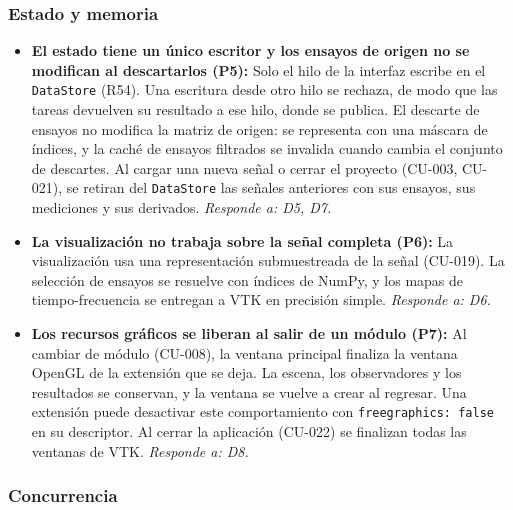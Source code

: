 \documentclass[11pt,a4paper]{article}
\DeclareRobustCommand{\_}{\textunderscore\allowbreak}
\begin{document}
\subsubsection{Estado y memoria}

\begin{itemize}
    \item \textbf{El estado tiene un único escritor y los ensayos de origen no se modifican al descartarlos (P5):} Solo el hilo de la interfaz escribe en el \texttt{DataStore} (R54). Una escritura desde otro hilo se rechaza, de modo que las tareas devuelven su resultado a ese hilo, donde se publica. El descarte de ensayos no modifica la matriz de origen: se representa con una máscara de índices, y la caché de ensayos filtrados se invalida cuando cambia el conjunto de descartes. Al cargar una nueva señal o cerrar el proyecto (CU-003, CU-021), se retiran del \texttt{DataStore} las señales anteriores con sus ensayos, sus mediciones y sus derivados. \textit{Responde a: D5, D7.}
    \item \textbf{La visualización no trabaja sobre la señal completa (P6):} La visualización usa una representación submuestreada de la señal (CU-019). La selección de ensayos se resuelve con índices de NumPy, y los mapas de tiempo-frecuencia se entregan a VTK en precisión simple. \textit{Responde a: D6.}
    \item \textbf{Los recursos gráficos se liberan al salir de un módulo (P7):} Al cambiar de módulo (CU-008), la ventana principal finaliza la ventana OpenGL de la extensión que se deja. La escena, los observadores y los resultados se conservan, y la ventana se vuelve a crear al regresar. Una extensión puede desactivar este comportamiento con \texttt{free\_graphics: false} en su descriptor. Al cerrar la aplicación (CU-022) se finalizan todas las ventanas de VTK. \textit{Responde a: D8.}
\end{itemize}

\subsubsection{Concurrencia}
\end{document}
